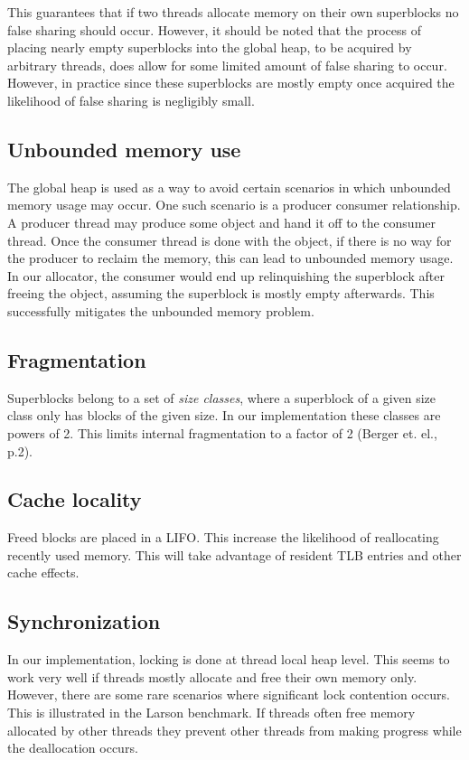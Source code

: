 \documentclass[oneside]{amsart}
\theoremstyle{definition}
\theoremstyle{remark}
\numberwithin{equation}{section}
\begin{document}
This guarantees that if two threads allocate memory on their own superblocks no false sharing should
occur. However, it should be noted that the process of placing nearly empty superblocks into the
global heap, to be acquired by arbitrary threads, does allow for some limited amount of false
sharing to occur. However, in practice since these superblocks are mostly empty once acquired the
likelihood of false sharing is negligibly small.

\subsection{Unbounded memory use}
The global heap is used as a way to avoid certain scenarios in which unbounded memory usage may
occur. One such scenario is a producer consumer relationship. A producer thread may produce some
object and hand it off to the consumer thread. Once the consumer thread is done with the object, if
there is no way for the producer to reclaim the memory, this can lead to unbounded memory usage.
In our allocator, the consumer would end up relinquishing the superblock after freeing the object,
assuming the superblock is mostly empty afterwards. This successfully mitigates the unbounded memory
problem.

\subsection{Fragmentation}
Superblocks belong to a set of \textit{size classes}, where a superblock of a given size class only
has blocks of the given size. In our implementation these classes are powers of 2. This limits
internal fragmentation to a factor of 2 (Berger et. el., p.2).

\subsection{Cache locality}
Freed blocks are placed in a LIFO. This increase the likelihood of reallocating recently used
memory. This will take advantage of resident TLB entries and other cache effects.

\subsection{Synchronization}
In our implementation, locking is done at thread local heap level. This seems to work very well if
threads mostly allocate and free their own memory only. However, there are some rare scenarios where
significant lock contention occurs. This is illustrated in the Larson benchmark. If threads often
free memory allocated by other threads they prevent other threads from making progress while the
deallocation occurs.
\end{document}
